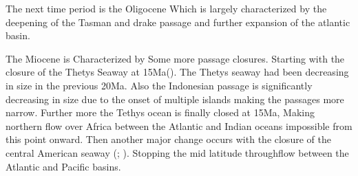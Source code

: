 
The next time period is the Oligocene Which is largely characterized by the deepening of the Tasman and drake passage and further expansion of the atlantic basin.


The Miocene is Characterized by Some more passage closures. Starting with the closure of the Thetys Seaway at 15Ma(\cite{Hamon2013Nov}). The Thetys seaway had been decreasing in size in the previous 20Ma. Also the Indonesian passage is significantly decreasing in size due to the onset  of multiple islands making the passages more narrow. Further more the Tethys ocean is finally closed at 15Ma, Making northern flow over Africa between the Atlantic and Indian oceans impossible from this point onward. Then another major change occurs with the closure of the central American seaway (\cite{Molnar2008Jun}; \cite{Pindell1988Dec}). Stopping the mid latitude throughflow between the Atlantic and Pacific basins.


